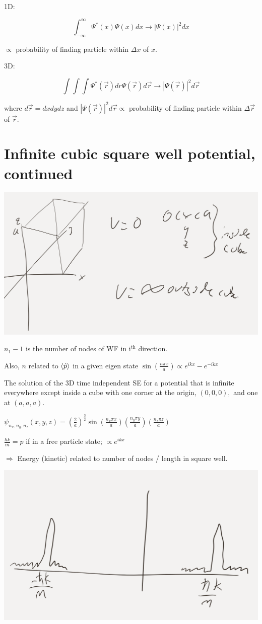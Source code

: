 \documentclass{article}
\begin{document}
1D:

$$\int_{- \infty}^\infty \Psi^*(x) \Psi(x) dx \rightarrow |\Psi(x)|^2 dx$$

$\propto$ probability of finding particle within $\Delta x$ of $x$. 

3D:

$$\int \int \int \Psi^*(\vec{r}) dr \Psi(\vec{r}) d \vec{r} \rightarrow |\Psi(\vec{r})|^2 d \vec{r}$$

where $d \vec{r} = dx dy dz$ and $|\Psi(\vec{r})|^2 d \vec{r} \propto$ probability of finding particle within $\Delta \vec r$ of $\vec r$. 


\section{Infinite cubic square well potential, continued}

\includegraphics[width = 0.6 \textwidth]{Lecture18/3.png}

$n_1 - 1$ is the number of nodes of WF in $\text{i}^\text{th}$ direction. 

Also, $n$ related to $\braket{\hat{p}}$ in a given eigen state $\sin \left( \frac{n \pi x}{a} \right) \propto e^{ikx} - e^{-ikx}$

The solution of the 3D time independent SE for a potential that is infinite everywhere except inside a cube with one corner at the origin, $(0,0,0),$ and one at $(a,a,a).$

$\psi_{n_x, n_y, n_z} (x,y,z) = \left( \frac{2}{a} \right)^{\frac{3}{2}} \sin \left( \frac{n_x \pi x}{a} \right) \left( \frac{n_y \pi y}{a} \right) \left( \frac{n_z \pi z}{a} \right)$

$\frac{\hbar k}{m} = p$ if in a free particle state; $\propto e^{ikx}$

$\Rightarrow$ Energy (kinetic) related to number of nodes / length in square well. 

\includegraphics[width = 0.8 \textwidth]{Lecture19/1.png}
\end{document}
